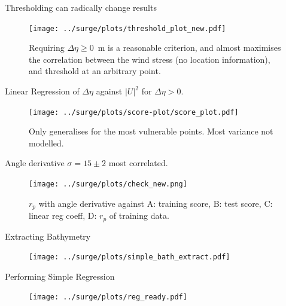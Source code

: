 \documentclass[usenames, dvipsnames]{beamer}
\begin{document}
\begin{frame}{Thresholding can radically change results  }
\vspace{-20pt}
\begin{figure}[htb!]
    \centering
    \hspace{-10pt}
    \texttt{[image: ../surge/plots/threshold\_plot\_new.pdf]}
    \vspace{-7pt}
   \caption{Requiring  $\Delta \eta \ge 0$~m is a reasonable criterion,
    and almost maximises the correlation between the wind stress (no location information),
     and threshold at an arbitrary point.}
\end{figure}
\end{frame}

\begin{frame}{Linear Regression of $ \Delta \eta$ against $|U|^2$ for $ \Delta\eta>0$.  }
\vspace{-20pt}
\begin{figure}[htb!]
    \centering
    \hspace{-10pt}
    \texttt{[image: ../surge/plots/score-plot/score\_plot.pdf]}
    \vspace{-7pt}
   \caption{Only generalises for the most vulnerable points. Most variance not modelled.}
    \label{fig:}
\end{figure}
\end{frame}

\begin{frame}{Angle derivative $\sigma=15\pm2$ most correlated.   }
\vspace{-20pt}
\begin{figure}[htb!]
    \centering
    \hspace{-10pt}
    \texttt{[image: ../surge/plots/check\_new.png]}
    \vspace{-7pt}
    \caption{$r_p$ with angle derivative against A: training score,
    B: test score, C: linear reg coeff,
    D: $r_p$ of training data.}
    \label{fig:}
\end{figure}
\end{frame}

\begin{frame}{Extracting Bathymetry}
\vspace{-30pt}
\begin{figure}[htb!]
    \centering
    \texttt{[image: ../surge/plots/simple\_bath\_extract.pdf]}
\end{figure}
\end{frame}

\begin{frame}{Performing Simple Regression }
\vspace{-20pt}
\begin{figure}[htb!]
    \centering
    \hspace{-10pt}
    \texttt{[image: ../surge/plots/reg\_ready.pdf]}
    \vspace{-7pt}
    \label{fig:}
\end{figure}
\end{frame}
\end{document}
